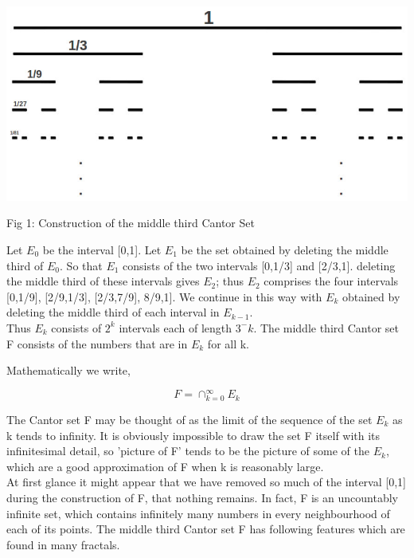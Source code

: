 \documentclass[14pt]{extarticle}
\begin{document}
\begin{center}

\includegraphics[scale=1]{cantor.jpeg}
\linebreak

Fig 1: Construction of the middle third Cantor Set

\end{center}
Let $E_0$ be the interval [0,1]. Let $E_1$ be the set obtained by deleting the middle third of $E_0$. So that $E_1$ consists of the two intervals [0,1/3] and [2/3,1]. deleting the middle third of these intervals gives $E_2$; thus $E_2$ comprises the four intervals [0,1/9], [2/9,1/3], [2/3,7/9], 8/9,1]. We continue in this way with $E_k$ obtained by deleting the middle third of each interval in $E_{k-1}$.\\
Thus $E_k$ consists of $2^k$ intervals each of length $3^-k$. The middle third Cantor set F consists of the numbers that are in $E_k$ for all k.

Mathematically we write,
\begin{large}
$$F=\cap_{k=0}^{\infty} E_k$$
\end{large}
The Cantor set F may be thought of as the limit of the sequence of the set $E_k$  as k tends to infinity. It is obviously impossible to draw the set F itself with its infinitesimal detail, so 'picture of F' tends to be the picture of some of the $E_k$, which are a good approximation of F when k is reasonably large.\\
At first glance it might appear that we have removed so much of the interval [0,1] during the construction of F, that nothing remains. In fact, F is an uncountably infinite set, which contains infinitely many numbers in every neighbourhood of each of its points. The middle third Cantor set F has following features which are found in many fractals.\\
\end{document}
